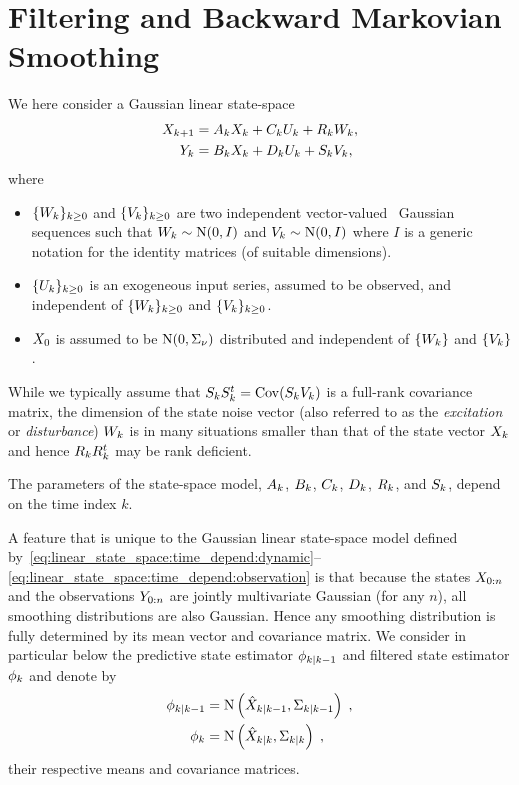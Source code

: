 
\section{Filtering and Backward Markovian Smoothing}
\label{sec:kalman:filtering}
We here consider a  Gaussian linear state-space
\begin{align}
X_{k+1} & = A_{k} X_k + C_{k} U_k + R_{k}W_{k}, \label{eq:linear_state_space:time_depend:dynamic}\\
Y_k & = B_{k} X_k + D_k U_k + S_{k} V_k, \label{eq:linear_state_space:time_depend:observation}
\end{align}
where 
\begin{itemize}
\item $\{W_k\}_{k\geq 0}$ and $\{V_k\}_{k\geq 0}$ are two independent vector-valued \iid\ Gaussian
sequences such that $W_k \sim \operatorname{N} (0, I)$ and $V_k \sim \operatorname{N} (0, I)$
where $I$ is a generic notation for the identity matrices (of suitable dimensions).
\item $\{U_k\}_{k\geq 0}$ is an exogeneous input series, assumed to be observed, and independent of $\{W_k\}_{k\geq 0}$ and $\{V_k\}_{k\geq 0}$. 
\item  $X_0$ is assumed to be $\operatorname{N}(0, \Sigma_{\nu})$ distributed and independent
of $\{W_k\}$ and $\{V_k\}$.
\end{itemize}
While we typically assume that $\VCov[k] = \PCov( \VRoot_k \V_k) $ is a full-rank
covariance matrix, the dimension of the state noise vector (also referred to as
the \textit{excitation} or  \textit{disturbance}) $W_k$ is in many situations
smaller than that of the state vector $X_k$ and hence
$\WCov[k]$ may be rank deficient.

The parameters of the state-space model, $A_k$, $B_k$, $C_k$, $D_k$, $R_k$, and $S_k$,
depend on the time index $k$. 

A feature that is unique to the Gaussian linear state-space model defined
by~\eqref{eq:linear_state_space:time_depend:dynamic}--\eqref{eq:linear_state_space:time_depend:observation}
is that because the states $\chunk{\X}{0}{n}$ and the observations
$\chunk{\Y}{0}{n}$ are jointly multivariate Gaussian (for any $n$),
all smoothing distributions are also Gaussian. Hence any smoothing distribution
is fully determined by its mean vector and covariance matrix. We consider in
particular below the predictive state estimator $\pred{k}{k-1}$ and filtered state estimator $\filt{k}$
and denote by
\begin{align}
\label{eq:SS:posterior-mean-covariance}
  \pred{k}{k-1} & = \gauss\left(\postmean{k}{k-1}, \postcov{k}{k-1}\right) \eqsp , \\
  \filt{k} & = \gauss\left(\filtmean{k}, \filtcov{k}\right) \eqsp,
\end{align}
their respective means and covariance matrices.


